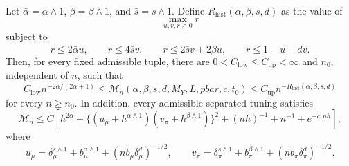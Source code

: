 Let \(\bar\alpha=\alpha\wedge1\), \(\bar\beta=\beta\wedge1\), and \(\bar s=s\wedge1\). Define \(R_{\mathrm{hist}}(\alpha,\beta,s,d)\) as the value of
\[
\max_{u,v,r\ge0}r
\]
subject to
\[
r\le2\bar\alpha u,\qquad
r\le4\bar s v,\qquad
r\le2\bar s v+2\bar\beta u,\qquad
r\le1-u-dv.
\]
Then, for every fixed admissible tuple, there are \(0<C_{\mathrm{low}}\le C_{\mathrm{up}}<\infty\) and \(n_0\), independent of \(n\), such that
\[
C_{\mathrm{low}}n^{-2\alpha/(2\alpha+1)}
\le
\mathcal M_n(\alpha,\beta,s,d,M_Y,L,pbar,c,t_0)
\le
C_{\mathrm{up}}n^{-R_{\mathrm{hist}}(\alpha,\beta,s,d)}
\]
for every \(n\ge n_0\). In addition, every admissible separated tuning satisfies
\[
\mathcal M_n\le C\left[h^{2\alpha}+\{(u_\mu+h^{\alpha\wedge1})(v_\pi+h^{\beta\wedge1})\}^2+(nh)^{-1}+n^{-1}+e^{-c_1nh}\right],
\]
where
\[
u_\mu=\delta_\mu^{s\wedge1}+b_\mu^{\alpha\wedge1}+(nb_\mu\delta_\mu^d)^{-1/2},
\qquad
v_\pi=\delta_\pi^{s\wedge1}+b_\pi^{\beta\wedge1}+(nb_\pi\delta_\pi^d)^{-1/2}.
\]